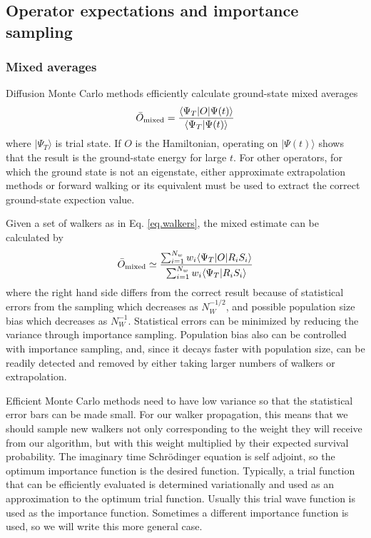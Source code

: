  \subsection{Operator expectations and importance sampling}
 \subsubsection{Mixed averages}
 \label{sec:mixav}
 Diffusion Monte Carlo methods efficiently calculate ground-state
 mixed averages
 \begin{equation}
 \label{eq:mixedobs}
 \bar O_{\rm mixed} = \frac{\langle \Psi_T | O |\Psi(t)\rangle}{\langle
 	\Psi_T|\Psi(t)\rangle}
 \end{equation}
 where $|\Psi_T\rangle $ is  trial state.
 If $O$ is the Hamiltonian, operating on $|\Psi(t)\rangle$ shows
 that the result
 is the ground-state energy for large $t$. For other operators, for which
 the ground state is not an eigenstate, either
 approximate extrapolation methods or forward walking or its equivalent
 must be used to extract the correct ground-state expection value.
 
 Given a set of walkers as in Eq. \ref{eq.walkers}, the mixed estimate can
 be calculated by
 \begin{equation}
 \bar O_{\rm mixed} \simeq
 \frac{ \sum_{i=1}^{N_w} w_i \langle \Psi_T|O|R_i S_i\rangle}
 { \sum_{i=1}^{N_w} w_i \langle \Psi_T|R_i S_i\rangle}
 \end{equation}
 where the right hand side differs from the correct result because
 of statistical errors from the sampling which decreases as $N_W^{-1/2}$,
 and possible population size bias which decreases as $N_W^{-1}$. Statistical
 errors can be minimized by reducing the variance through importance
 sampling.  Population
 bias also can be controlled with importance sampling, and, since it decays
 faster with population size, can be readily detected
 and removed by either taking larger numbers of walkers or extrapolation.
 
 Efficient Monte Carlo methods need to have low variance so that the
 statistical error bars can be made small. For our walker propagation,
 this means that we should sample new walkers not only corresponding to
 the weight they will receive from our algorithm, but with this weight
 multiplied by their expected survival probability. The imaginary time
 Schr\"odinger equation is self adjoint, so the optimum importance
 function is the desired function. Typically, a trial
 function that can be efficiently evaluated is determined variationally
 and used as an approximation to the optimum trial function. Usually
 this trial wave function is used as the importance
 function. Sometimes a different importance function is used, so we will
 write this more general case. 
 
